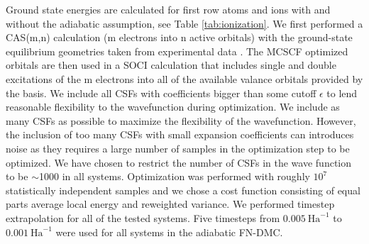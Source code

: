 \documentclass[pra,superscriptaddress,groupedaddress,twocolumn]{revtex4}
\begin{document}
Ground state energies are calculated for first row atoms and ions with and without the adiabatic assumption, see Table \ref{tab:ionization}. %
We first performed a CAS(m,n) calculation (m electrons into n active orbitals) with the ground-state equilibrium geometries taken from experimental data \cite{CCCBDB}. The MCSCF optimized orbitals are then used in a SOCI calculation that includes single and double excitations of the m electrons into all of the available valance orbitals provided by the basis. %
We include all CSFs with coefficients bigger than some cutoff $\epsilon$ to lend reasonable flexibility to the wavefunction during optimization. %
We include as many CSFs as possible to maximize the flexibility of the wavefunction. However, the inclusion of too many CSFs with small expansion coefficients can introduces noise as they requires a large number of samples in the optimization step to be optimized. 
We have chosen to restrict the number of CSFs in the wave function to be $\sim$1000 in all systems. 
Optimization was performed with roughly $10^7$ statistically independent samples and we chose a cost function consisting of equal parts average local energy and reweighted variance. %
  We performed timestep extrapolation for all of the tested systems. Five timesteps from $0.005~\text{Ha}^{-1}$ to $0.001~\text{Ha}^{-1}$ were used for all systems in the adiabatic FN-DMC.%
\end{document}
